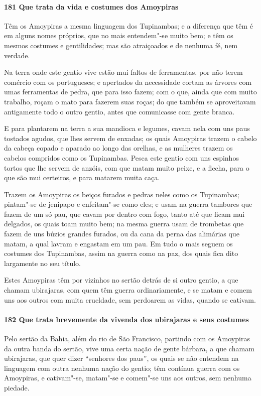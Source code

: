 \paragraph{181 Que trata da vida e costumes dos Amoypiras}

Têm os Amoypiras a mesma linguagem dos Tupinambas; e a diferença que têm é em alguns nomes
próprios, que no mais entendem"-se muito bem; e têm os mesmos costumes e gentilidades; mas
são atraiçoados e de nenhuma fé, nem verdade.

Na terra onde este gentio vive estão mui faltos de ferramentas, por não terem comércio com
os portugueses; e apertados da necessidade cortam as árvores com umas ferramentas de
pedra, que para isso fazem; com o que, ainda que com muito trabalho, roçam o mato para
fazerem suas roças; do que também se aproveitavam antigamente todo o outro gentio, antes
que comunicasse com gente branca.

E para plantarem na terra a sua mandioca e legumes, cavam nela com uns paus tostados
agudos, que lhes servem de enxadas; os quais Amoypiras trazem o cabelo da cabeça copado e
aparado ao longo das orelhas, e as mulheres trazem os cabelos compridos como os
Tupinambas. Pesca este gentio com uns espinhos tortos que lhe servem de anzóis, com que
matam muito peixe, e a flecha, para o que são mui certeiros, e para matarem muita caça.

Trazem os Amoypiras os beiços furados e pedras neles como os Tupinambas; pintam"-se de
jenipapo e enfeitam"-se como eles; e usam na guerra tambores que fazem de um só pau, que
cavam por dentro com fogo, tanto até que ficam mui delgados, os quais toam muito bem; na
mesma guerra usam de trombetas que fazem de uns búzios grandes furados, ou da cana da
perna das alimárias que matam, a qual lavram e engastam em um pau. Em tudo o mais seguem
os costumes dos Tupinambas, assim na guerra como na paz, dos quais fica dito largamente no
seu título.

Estes Amoypiras têm por vizinhos no sertão detrás de si outro gentio, a que chamam
ubirajaras, com quem têm guerra ordinariamente, e se matam e comem uns aos outros com
muita crueldade, sem perdoarem as vidas, quando se cativam.

\paragraph{182 Que trata brevemente da vivenda dos ubirajaras e seus costumes}

Pelo sertão da Bahia, além do rio de São Francisco, partindo com os Amoypiras da outra
banda do sertão, vive uma certa nação de gente bárbara, a que chamam ubirajaras, que quer
dizer ``senhores dos paus'', os quais se não entendem na linguagem com outra nenhuma nação
do gentio; têm contínua guerra com os Amoypiras, e cativam"-se, matam"-se e comem"-se uns aos
outros, sem nenhuma piedade.

